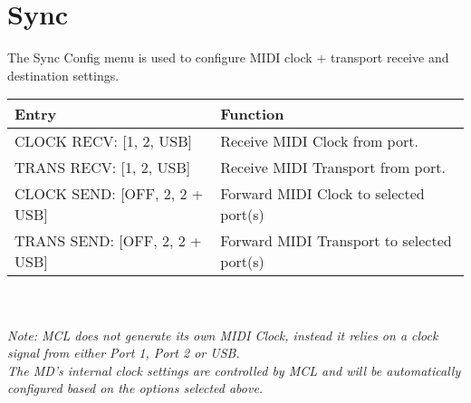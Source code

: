 \newpage

\section{Sync}
The Sync Config menu is used to configure MIDI clock + transport receive and destination settings.
\\
\begin{tabular}{|l|l|}
\hline
\rowcolor[HTML]{C0C0C0} 
Entry                                  & Function                                                                       \\ \hline
CLOCK RECV: {[}1, 2, USB{]}                & Receive MIDI Clock from port.                                                  \\ \hline
TRANS RECV: {[}1, 2, USB{]}                & Receive MIDI Transport from port.                                               \\ \hline
CLOCK SEND: {[}OFF, 2, 2 + USB{]}          & Forward MIDI Clock to selected port(s)                                            \\ \hline
TRANS SEND: {[}OFF, 2, 2 + USB{]}          & Forward MIDI Transport to selected port(s)                                        \\ \hline
\end{tabular}
\\\\
\textit{Note: MCL does not generate its own MIDI Clock, instead it relies on a clock signal from either Port 1, Port 2 or USB.}
\\
\textit{The MD's internal clock settings are controlled by MCL and will be automatically configured based on the options selected above.}

